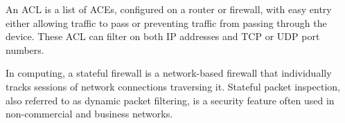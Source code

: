 \label{chap:firewalls}


An \acf{ACL} is a list of \acfp{ACE}, configured on a router or firewall, with easy entry either allowing traffic to pass or preventing traffic from passing through the device.
These \acl{ACL} can filter on both \acs{IP} addresses and \acs{TCP} or \acs{UDP} port numbers.


In computing, a stateful firewall is a network-based firewall that individually tracks sessions of network connections traversing it.
Stateful packet inspection, also referred to as dynamic packet filtering, is a security feature often used in non-commercial and business networks.



